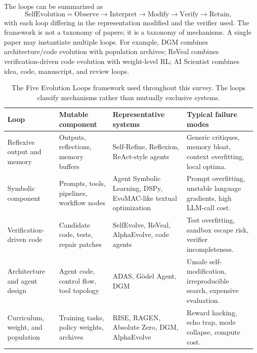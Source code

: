 The loops can be summarized as
\begin{equation}
\mathrm{SelfEvolution} = \mathrm{Observe} \rightarrow \mathrm{Interpret} \rightarrow \mathrm{Modify} \rightarrow \mathrm{Verify} \rightarrow \mathrm{Retain},
\end{equation}
with each loop differing in the representation modified and the verifier used. The framework is not a taxonomy of papers; it is a taxonomy of mechanisms. A single paper may instantiate multiple loops. For example, DGM combines architecture/code evolution with population archives; ReVeal combines verification-driven code evolution with weight-level RL; AI Scientist combines idea, code, manuscript, and review loops.

\begin{table}[t]
\centering
{\TableTight
\begin{tabularx}{\textwidth}{@{}L{0.18\textwidth}L{0.19\textwidth}L{0.25\textwidth}Y@{}}
\toprule
\textbf{Loop} & \textbf{Mutable component} & \textbf{Representative systems} & \textbf{Typical failure modes} \\
 \midrule
Reflexive output and memory & Outputs, reflections, memory buffers & Self-Refine, Reflexion, ReAct-style agents & Generic critiques, memory bloat, context overfitting, local optima. \\
Symbolic component & Prompts, tools, pipelines, workflow nodes & Agent Symbolic Learning, DSPy, EvoMAC-like textual optimization & Prompt overfitting, unstable language gradients, high LLM-call cost. \\
Verification-driven code & Candidate code, tests, repair patches & SelfEvolve, ReVeal, AlphaEvolve, code agents & Test overfitting, sandbox escape risk, verifier incompleteness. \\
Architecture and agent design & Agent code, control flow, tool topology & ADAS, G{\"o}del Agent, DGM & Unsafe self-modification, irreproducible search, expensive evaluation. \\
Curriculum, weight, and population & Training tasks, policy weights, archives & RISE, RAGEN, Absolute Zero, DGM, AlphaEvolve & Reward hacking, echo trap, mode collapse, compute cost. \\
\bottomrule
\end{tabularx}}
\caption{The Five Evolution Loops framework used throughout this survey. The loops classify mechanisms rather than mutually exclusive systems.}
\label{tab:five-loops}
\end{table}

